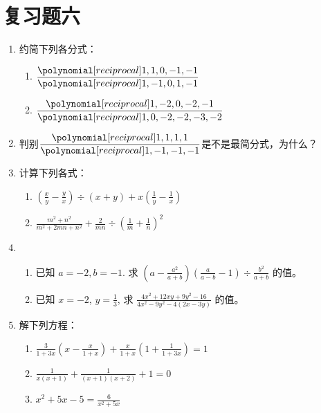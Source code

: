 \section*{复习题六}
\begin{enumerate}
    \item 约简下列各分式：
    \begin{multicols}{2}
\begin{enumerate}
    \item $\frac{\poly{1,1,0,-1,-1}}{\poly{1,-1,0,1,-1}}$
    \item $\frac{\poly{1,-2,0,-2,-1}}{\poly{1,0,-2,-2,-3,-2}}$
\end{enumerate}
\end{multicols}

\item 判别$\frac{\poly{1,1,1,1}}{\poly{1,-1,-1,-1}}$是不是最简分式，为什么？

\item 计算下列各式：
    \begin{enumerate}
    \item $\left(\frac{x}{y}-\frac{y}{x}\right) \div(x+y)+x\left(\frac{1}{y}-\frac{1}{x}\right)$
    \item $\frac{m^{2}+n^{2}}{m^{2}+2 m n+n^{2}}+\frac{2}{m n} \div\left(\frac{1}{m}+\frac{1}{n}\right)^{2}$
\end{enumerate}


\item \begin{enumerate}
    \item 已知 $a=-2, b=-1$. 求 $\left(a-\frac{a^{2}}{a+b}\right)\left(\frac{a}{a-b}-1\right)\div \frac{b^{2}}{a+b}$ 的值。
    \item 已知 $x=-2$, $y=\frac{1}{3}$, 求 $\frac{4 x^{2}+12 x y+9 y^{2}-16}{4 x^{2}-9 y^{2}-4(2 x-3 y)}$ 的值。
\end{enumerate}

\item 解下列方程：
\begin{enumerate}
    \item $\frac{3}{1+3 x}\left(x-\frac{x}{1+x}\right)+\frac{x}{1+x}\left(1+\frac{1}{1+3 x}\right)=1$
    \item $\frac{1}{x(x+1)}+\frac{1}{(x+1)(x+2)}+1=0$
    \item $x^{2}+5 x-5=\frac{6}{x^{2}+5 x}$
\end{enumerate}


\end{enumerate}
